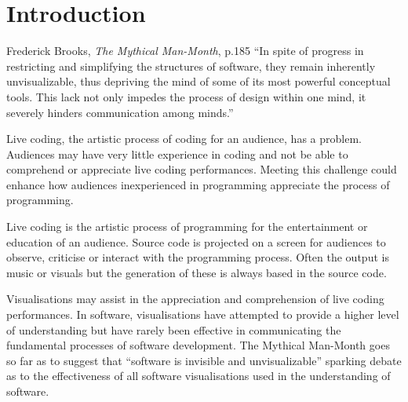 
\chapter{Introduction}
\label{chap:introduction}

\begin{chapquote}{Frederick Brooks, \textit{The Mythical Man-Month}, p.185}
``In spite of progress in restricting and simplifying the structures of software, they remain inherently unvisualizable, thus depriving the mind of some of its most powerful conceptual tools. This lack not only impedes the process of design within one mind, it severely hinders communication among minds.''
\end{chapquote}









Live coding, the artistic process of coding for an audience, has a problem. Audiences may have very little experience in coding and not be able to comprehend or appreciate live coding performances. Meeting this challenge could enhance how audiences inexperienced in programming appreciate the process of programming.

Live coding is the artistic process of programming for the entertainment or education of an audience. Source code is projected on a screen for audiences to observe, criticise or interact with the programming process. Often the output is music or visuals but the generation of these is always based in the source code.

Visualisations may assist in the appreciation and comprehension of live coding performances. In software, visualisations have attempted to provide a higher level of understanding but have rarely been effective in communicating the fundamental processes of software development. The Mythical Man-Month goes so far as to suggest that ``software is invisible and unvisualizable''\cite{Brooks1995} sparking debate as to the effectiveness of all software visualisations used in the understanding of software.

